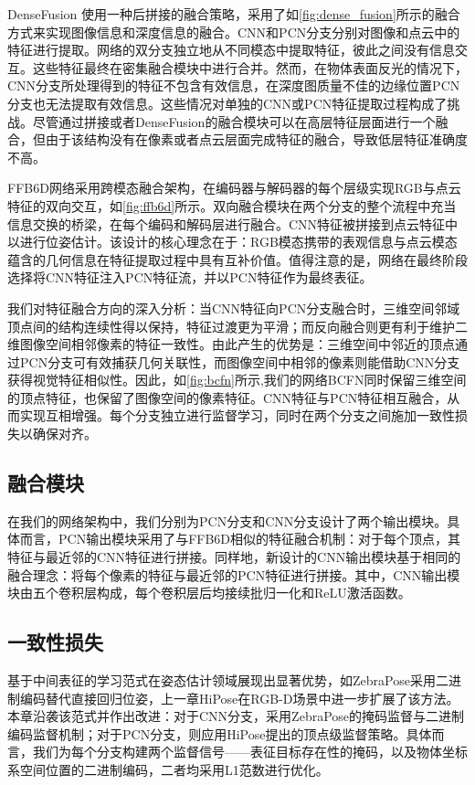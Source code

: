 DenseFusion\cite{wang2019densefusion} 使用一种后拼接的融合策略，采用了如\autoref{fig:dense_fusion}所示的融合方式来实现图像信息和深度信息的融合。CNN和PCN分支分别对图像和点云中的特征进行提取。网络的双分支独立地从不同模态中提取特征，彼此之间没有信息交互。这些特征最终在密集融合模块中进行合并。然而，在物体表面反光的情况下，CNN分支所处理得到的特征不包含有效信息，在深度图质量不佳的边缘位置PCN分支也无法提取有效信息。这些情况对单独的CNN或PCN特征提取过程构成了挑战。尽管通过拼接或者DenseFusion的融合模块可以在高层特征层面进行一个融合，但由于该结构没有在像素或者点云层面完成特征的融合，导致低层特征准确度不高。

FFB6D网络采用跨模态融合架构，在编码器与解码器的每个层级实现RGB与点云特征的双向交互，如\autoref{fig:ffb6d}所示。双向融合模块在两个分支的整个流程中充当信息交换的桥梁，在每个编码和解码层进行融合。CNN特征被拼接到点云特征中以进行位姿估计。该设计的核心理念在于：RGB模态携带的表观信息与点云模态蕴含的几何信息在特征提取过程中具有互补价值。值得注意的是，网络在最终阶段选择将CNN特征注入PCN特征流，并以PCN特征作为最终表征。

我们对特征融合方向的深入分析：当CNN特征向PCN分支融合时，三维空间邻域顶点间的结构连续性得以保持，特征过渡更为平滑；而反向融合则更有利于维护二维图像空间相邻像素的特征一致性。由此产生的优势是：三维空间中邻近的顶点通过PCN分支可有效捕获几何关联性，而图像空间中相邻的像素则能借助CNN分支获得视觉特征相似性。因此，如\autoref{fig:bcfn}所示,我们的网络BCFN同时保留三维空间的顶点特征，也保留了图像空间的像素特征。CNN特征与PCN特征相互融合，从而实现互相增强。每个分支独立进行监督学习，同时在两个分支之间施加一致性损失以确保对齐。

\subsection{融合模块}

\par 在我们的网络架构中，我们分别为PCN分支和CNN分支设计了两个输出模块。具体而言，PCN输出模块采用了与FFB6D相似的特征融合机制：对于每个顶点，其特征与最近邻的CNN特征进行拼接。同样地，新设计的CNN输出模块基于相同的融合理念：将每个像素的特征与最近邻的PCN特征进行拼接。其中，CNN输出模块由五个卷积层构成，每个卷积层后均接续批归一化和ReLU激活函数。

\subsection{一致性损失}

\par 基于中间表征的学习范式在姿态估计领域展现出显著优势，如ZebraPose\cite{su2022zebrapose}采用二进制编码替代直接回归位姿，上一章HiPose在RGB-D场景中进一步扩展了该方法。本章沿袭该范式并作出改进：对于CNN分支，采用ZebraPose的掩码监督与二进制编码监督机制；对于PCN分支，则应用HiPose提出的顶点级监督策略。具体而言，我们为每个分支构建两个监督信号——表征目标存在性的掩码，以及物体坐标系空间位置的二进制编码，二者均采用L1范数进行优化。

